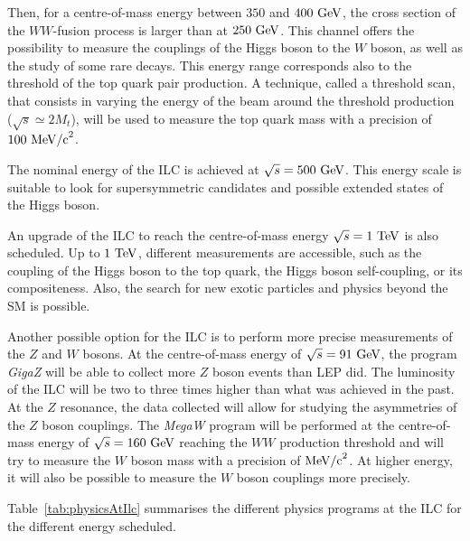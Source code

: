   Then, for a centre-of-mass energy between $350$ and $400~\rm{GeV}$, the cross section of the $WW$-fusion process is larger than at $250~\rm{GeV}$.
  This channel offers the possibility to measure the couplings of the Higgs boson to the $W$ boson, as well as the study of some rare decays.
  This energy range corresponds also to the threshold of the top quark pair production.
  A technique, called a threshold scan, that consists in varying the energy of the beam around the threshold production ($\sqrt{s} \simeq 2M_{t}$), will be used to measure the top quark mass with a precision of $100~\rm{MeV/c}^2$.

  The nominal energy of the \gls{ILC} is achieved at $\sqrt{s} = 500~\rm{GeV}$.
  This energy scale is suitable to look for supersymmetric candidates and possible extended states of the Higgs boson.

  An upgrade of the \gls{ILC} to reach the centre-of-mass energy $\sqrt{s} = 1~\rm{TeV}$ is also scheduled.
  Up to $1~\rm{TeV}$, different measurements are accessible, such as the coupling of the Higgs boson to the top quark, the Higgs boson self-coupling, or its compositeness.
  Also, the search for new exotic particles and physics beyond the \gls{SM} is possible.

  Another possible option for the \gls{ILC} is to perform more precise measurements of the $Z$ and $W$ bosons.
  At the centre-of-mass energy of $\sqrt{s} = 91~\rm{GeV}$, the program \textit{GigaZ} will be able to collect more $Z$ boson events than \gls{LEP} did.
  The luminosity of the \gls{ILC} will be two to three times higher than what was achieved in the past.
  At the $Z$ resonance, the data collected will allow for studying the asymmetries of the $Z$ boson couplings.
  The \textit{MegaW} program will be performed at the centre-of-mass energy of $\sqrt{s} = 160~\rm{GeV}$ reaching the $WW$ production threshold and will try to measure the $W$ boson mass with a precision of $\rm{MeV/c}^2$.
  At higher energy, it will also be possible to measure the $W$ boson couplings more precisely.
 
  Table~\ref{tab:physicsAtIlc} summarises the different physics programs at the \gls{ILC} for the different energy scheduled.  


